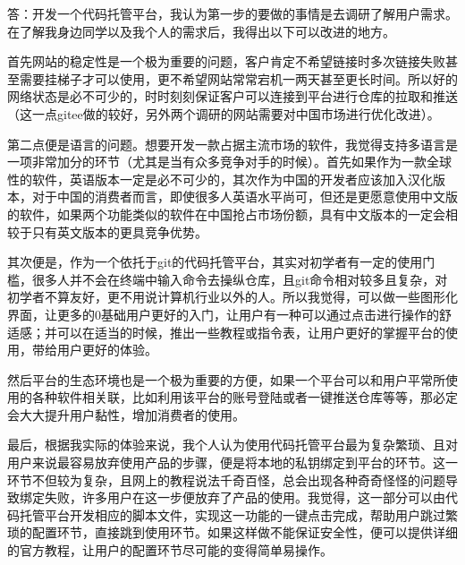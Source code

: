 \documentclass{homework}
\begin{document}
\normalsize 答：开发一个代码托管平台，我认为第一步的要做的事情是去调研了解用户需求。在了解我身边同学以及我个人的需求后，我得出以下可以改进的地方。
\par 首先网站的稳定性是一个极为重要的问题，客户肯定不希望链接时多次链接失败甚至需要挂梯子才可以使用，更不希望网站常常宕机一两天甚至更长时间。所以好的网络状态是必不可少的，时时刻刻保证客户可以连接到平台进行仓库的拉取和推送（这一点gitee做的较好，另外两个调研的网站需要对中国市场进行优化改进）。
\par 第二点便是语言的问题。想要开发一款占据主流市场的软件，我觉得支持多语言是一项非常加分的环节（尤其是当有众多竞争对手的时候）。首先如果作为一款全球性的软件，英语版本一定是必不可少的，其次作为中国的开发者应该加入汉化版本，对于中国的消费者而言，即使很多人英语水平尚可，但还是更愿意使用中文版的软件，如果两个功能类似的软件在中国抢占市场份额，具有中文版本的一定会相较于只有英文版本的更具竞争优势。
\par 其次便是，作为一个依托于git的代码托管平台，其实对初学者有一定的使用门槛，很多人并不会在终端中输入命令去操纵仓库，且git命令相对较多且复杂，对初学者不算友好，更不用说计算机行业以外的人。所以我觉得，可以做一些图形化界面，让更多的0基础用户更好的入门，让用户有一种可以通过点击进行操作的舒适感；并可以在适当的时候，推出一些教程或指令表，让用户更好的掌握平台的使用，带给用户更好的体验。
\par 然后平台的生态环境也是一个极为重要的方便，如果一个平台可以和用户平常所使用的各种软件相关联，比如利用该平台的账号登陆或者一键推送仓库等等，那必定会大大提升用户黏性，增加消费者的使用。
\par 最后，根据我实际的体验来说，我个人认为使用代码托管平台最为复杂繁琐、且对用户来说最容易放弃使用产品的步骤，便是将本地的私钥绑定到平台的环节。这一环节不但较为复杂，且网上的教程说法千奇百怪，总会出现各种奇奇怪怪的问题导致绑定失败，许多用户在这一步便放弃了产品的使用。我觉得，这一部分可以由代码托管平台开发相应的脚本文件，实现这一功能的一键点击完成，帮助用户跳过繁琐的配置环节，直接跳到使用环节。如果这样做不能保证安全性，便可以提供详细的官方教程，让用户的配置环节尽可能的变得简单易操作。
\end{document}
